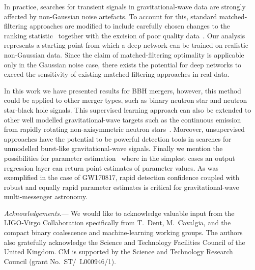 \documentclass[%
showpacs,
 amsmath,amssymb,
 aps,
 twocolumn,
 prl,
 reprint,
floatfix,
]{revtex4-1}
\begin{document}
%
%
In practice, searches for transient signals in gravitational-wave data are
strongly affected by non-Gaussian noise artefacts. To account for this,
standard matched-filtering approaches are modified to include carefully chosen
changes to the ranking statistic~\cite{PhysRevD.71.062001,0004-637X-849-2-118}
together with the excision of poor quality data~\cite{1710.02185,
0264-9381-33-13-134001}. Our analysis represents a starting point from which a
deep network can be trained on realistic non-Gaussian data. Since the claim of
matched-filtering optimality is applicable only in the Gaussian noise case,
there exists the potential for deep networks to exceed the sensitivity of
existing matched-filtering approaches in real data.

%
%
In this work we have presented results for \ac{BBH} mergers, however, this
method could be applied to other merger types, such as binary neutron star and
neutron star-black hole signals. This supervised learning approach can also be
extended to other well modelled gravitational-wave targets such as the
continuous emission from rapidly rotating non-axisymmetric neutron
stars~\cite{1707.02669}. Moreover, unsupervised approaches have the potential
to be powerful detection tools in searches for unmodelled burst-like
gravitational-wave signals. Finally we mention the possibilities for parameter
estimation~\cite{1701.00008} where in the simplest cases an output regression
layer can return point estimates of parameter values. As was exemplified in the
case of GW170817, rapid detection confidence coupled with robust and equally
rapid parameter estimates is critical for gravitational-wave multi-messenger
astronomy. 

%
%
\emph{Acknowledgements.}---
%
We would like to acknowledge valuable input from the LIGO-Virgo Collaboration
specifically from T.~Dent, M.~Cavalgia, and the compact binary coalescence and
machine-learning working groups. The authors also gratefully acknowledge the
Science and Technology Facilities Council of the United Kingdom. CM is
supported by the Science and Technology Research Council (grant
No.~ST/~L000946/1).
%




\end{document}
